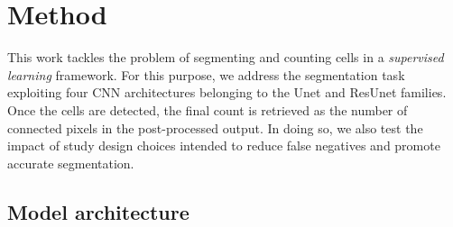 \chapter{Method}
\label{chap:partI_methods}

This work tackles the problem of segmenting and counting cells in a \textit{supervised learning} framework. For this purpose, we address the segmentation task exploiting four CNN architectures belonging to the Unet and ResUnet families. 
Once the cells are detected, the final count is retrieved as the number of connected pixels in the post-processed output.
In doing so, we also test the impact of study design choices intended to reduce false negatives and promote accurate segmentation.

\section{Model architecture}
\label{model_architecture}

